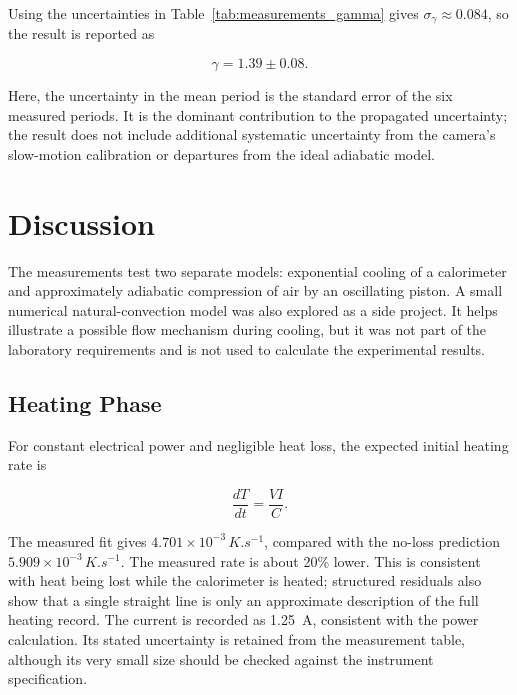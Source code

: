\documentclass[12pt,a4paper]{article}
\begin{document}
Using the uncertainties in Table~\ref{tab:measurements_gamma}
gives $\sigma_\gamma\approx0.084$, so the result is reported as

\begin{equation*}
    \boxed{\gamma=1.39\pm0.08}.
\end{equation*}

Here, the uncertainty in the mean period is the standard error
of the six measured periods. It is the dominant contribution to
the propagated uncertainty; the result does not include additional
systematic uncertainty from the camera's slow-motion calibration
or departures from the ideal adiabatic model.

\newpage

\section{Discussion}

The measurements test two separate models: exponential cooling
of a calorimeter and approximately adiabatic compression of air
by an oscillating piston. A small numerical natural-convection
model was also explored as a side project. It helps illustrate a
possible flow mechanism during cooling, but it was not part of
the laboratory requirements and is not used to calculate the
experimental results.

\subsection{Heating Phase}

For constant electrical power and negligible heat loss, the
expected initial heating rate is

\begin{equation}
    \frac{dT}{dt}=\frac{VI}{C}.
\end{equation}

The measured fit gives $4.701\times10^{-3}\,\si{K.s^{-1}}$,
compared with the no-loss prediction
$5.909\times10^{-3}\,\si{K.s^{-1}}$. The measured rate is about
20\% lower. This is consistent with heat being lost while the
calorimeter is heated; structured residuals also show that a
single straight line is only an approximate description of the
full heating record. The current is recorded as \SI{1.25}{A},
consistent with the power calculation. Its stated uncertainty is
retained from the measurement table, although its very small size
should be checked against the instrument specification.
\end{document}
